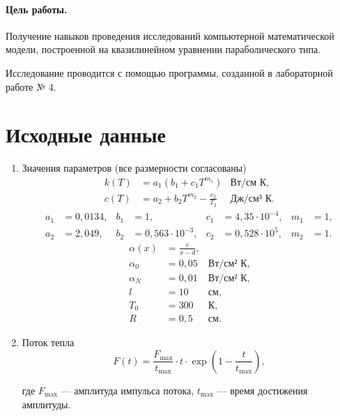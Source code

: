 \documentclass[a4paper,oneside,12pt]{extreport}
\begin{document}


\paragraph{Цель работы.} Получение навыков проведения исследований компьютерной математической модели, построенной на квазилинейном уравнении параболического типа.

Исследование проводится с помощью программы, созданной в лабораторной работе № 4.

\section*{Исходные данные}

\begin{enumerate}
	\item Значения параметров (все размерности согласованы)
	\begin{equation*}
		\begin{aligned}
			k(T) &= a_1(b_1 + c_1T^{m_1}) &\text{Вт/см К},\\
			c(T) &= a_2+b_2T^{m_2}-\frac{c_2}{T_2} &\text{Дж/см³ К}.
		\end{aligned}
	\end{equation*}
	\begin{equation*}
		\begin{aligned}
			a_1 &= 0,0134, & b_1 &= 1,                 & c_1 &= 4,35\cdot10^{-4}, & m_1 &= 1,\\
			a_2 &= 2,049,  & b_2 &= 0,563\cdot10^{-3}, & c_2 &= 0,528\cdot10^5,   & m_2 &= 1.
		\end{aligned}
	\end{equation*}
	\begin{equation*}
		\begin{aligned}
			\alpha(x) &= \frac{c}{x-d}, &                 \\
			\alpha_0  &= 0,05           & \text{Вт/см² К},\\
			\alpha_N  &= 0,01           & \text{Вт/см² К},\\
			l         &= 10             & \text{см},      \\
			T_0       &= 300            & \text{К},       \\
			R         &= 0,5            & \text{см}.
		\end{aligned}
	\end{equation*}

	 \item Поток тепла
	\begin{equation*}
	F(t) = \frac{F_{\max}}{t_{\max}} \cdot t \cdot \exp{\left(1 - \frac{t}{t_{\max}}\right)},
	\end{equation*}

	где $F_{\max}$ — амплитуда импульса потока, $t_{\max}$ — время достижения амплитуды.
\end{enumerate}
\end{document}
